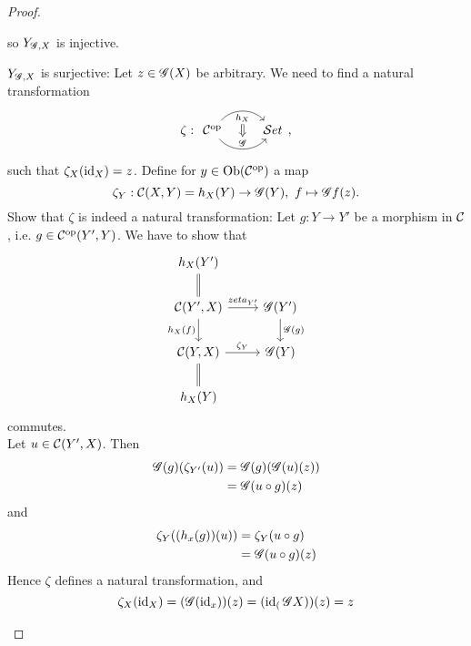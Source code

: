 \begin{proof}
\begin{enumerate}
so $Y_{\mathscr{G},X}$ is injective.\par
$Y_{\mathscr{G},X}$ is surjective: Let $z\in \mathscr{G}(X)$ be arbitrary. We need to find a natural transformation
\[
\zeta: \begin{tikzcd}
\op{\ccat} \arrow[r, bend left=50, "h_X"{name=U, below}]
\arrow[r, bend right=50, "\gfunc"{name=D}]
&\stc
\arrow[Rightarrow, from=U, to=D]
\end{tikzcd},\]
such that $\zeta_X(\operatorname{id}_X)=z$. Define for $y\in \text{Ob}(\mathcal{C}^{\mathrm{op}})$ a map
\[
\zeta_Y:\mathcal{C}(X,Y) = h_X(Y)\to \mathscr{G} (Y),~f\mapsto \mathscr{G} f(z).
\]
Show that $\zeta$ is indeed a natural transformation:
Let $g:Y\to Y'$ be a morphism in $\mathcal{C}$, i.e. $g\in \mathcal{C}^{\mathrm{op}}(Y',Y)$. We have to show that
\[
\begin{tikzcd}
h_X(Y')\ar[equal]{d}&\\
\ccat(Y',X)\ar{r}{zeta_{Y'}}\ar[swap]{d}{h_X(f)}&\gfunc(Y')\ar{d}{\gfunc(g)}\\
\ccat(Y,X)\ar{r}{\zeta_Y}&\gfunc(Y)\\
h_X(Y)\ar[equal]{u}&
\end{tikzcd}
\]
commutes. \\
Let $u\in \mathcal{C}(Y',X)$. Then
\begin{align*}
  \mathscr{G}(g)(\zeta_{Y'}(u))&= \mathscr{G}(g)(\mathscr{G}(u) (z))\\
                          &= \mathscr{G}(u\circ g)(z)
\end{align*}
and
\begin{align*}
  \zeta_Y((h_x(g))(u))&= \zeta_Y(u\circ g)\\
                    &= \mathscr{G}(u\circ g)(z)
\end{align*}
Hence $\zeta$ defines a natural transformation, and
\[
\zeta_X(\operatorname{id}_X) = (\mathscr{G}(\operatorname{id}_x))(z) = (\operatorname{id}_(\mathscr{G} X))(z) = z
\]

  \end{enumerate}
\end{proof}



\lec
